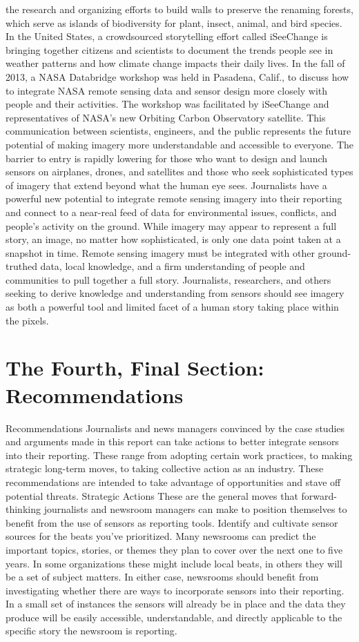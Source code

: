 the research and organizing efforts to build walls to preserve the renaming
forests, which serve as islands of biodiversity for plant, insect, animal, and
bird species.
In the United States, a crowdsourced storytelling effort called iSeeChange
is bringing together citizens and scientists to document the trends people
see in weather patterns and how climate change impacts their daily lives. In
the fall of 2013, a NASA Databridge workshop was held in Pasadena, Calif.,
to discuss how to integrate NASA remote sensing data and sensor design
more closely with people and their activities. The workshop was facilitated
by iSeeChange and representatives of NASA's new Orbiting Carbon Observatory
satellite. This communication between scientists, engineers, and the
public represents the future potential of making imagery more understandable
and accessible to everyone.
The barrier to entry is rapidly lowering for those who want to design and
launch sensors on airplanes, drones, and satellites and those who seek
sophisticated types of imagery that extend beyond what the human eye sees.
Journalists have a powerful new potential to integrate remote sensing imagery
into their reporting and connect to a near-real feed of data for environmental
issues, conflicts, and people's activity on the ground. While imagery
may appear to represent a full story, an image, no matter how sophisticated,
is only one data point taken at a snapshot in time. Remote sensing imagery
must be integrated with other ground-truthed data, local knowledge,
and a firm understanding of people and communities to pull together a full
story. Journalists, researchers, and others seeking to derive knowledge and
understanding from sensors should see imagery as both a powerful tool and
limited facet of a human story taking place within the pixels.


\chapter{The Fourth, Final Section: Recommendations}


Recommendations
Journalists and news managers convinced by the case studies and arguments
made in this report can take actions to better integrate sensors into
their reporting. These range from adopting certain work practices, to making
strategic long-term moves, to taking collective action as an industry.
These recommendations are intended to take advantage of opportunities
and stave off potential threats.
Strategic Actions
These are the general moves that forward-thinking journalists and newsroom
managers can make to position themselves to benefit from the use of
sensors as reporting tools.
Identify and cultivate sensor sources for the beats
you've prioritized.
Many newsrooms can predict the important topics, stories, or themes they
plan to cover over the next one to five years. In some organizations these
might include local beats, in others they will be a set of subject matters. In
either case, newsrooms should benefit from investigating whether there are
ways to incorporate sensors into their reporting. In a small set of instances
the sensors will already be in place and the data they produce will be easily
accessible, understandable, and directly applicable to the specific story the
newsroom is reporting.

